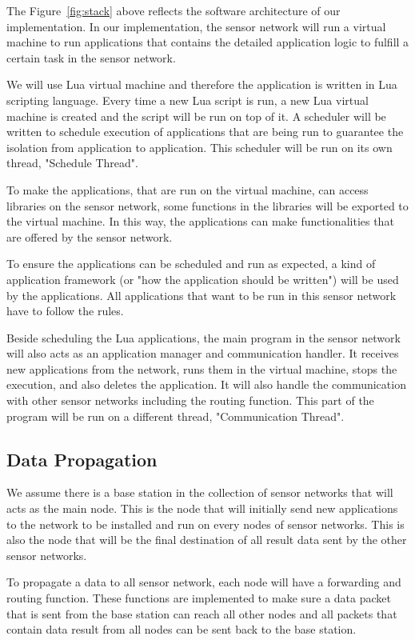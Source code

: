 \documentclass[a4paper,11pt]{article}
\begin{document}
The Figure~\ref{fig:stack} above reflects the software architecture of our
implementation. In our implementation, the sensor network will run a virtual
machine to run applications that contains the detailed application logic to
fulfill a certain task in the sensor network.

We will use Lua virtual machine and therefore the application is written in Lua
scripting language. Every time a new Lua script is run, a new Lua virtual
machine is created and the script will be run on top of it. A scheduler will be
written to schedule execution of applications that are being run to guarantee
the isolation from application to application. This scheduler will be run on
its own thread, "Schedule Thread".

To make the applications, that are run on the virtual machine, can access
libraries on the sensor network, some functions in the libraries will be
exported to the virtual machine. In this way, the applications can make
functionalities that are offered by the sensor network.

To ensure the applications can be scheduled and run as expected, a kind of
application framework (or "how the application should be written") will be used
by the applications. All applications that want to be run in this sensor
network have to follow the rules.

Beside scheduling the Lua applications, the main program in the sensor network
will also acts as an application manager and communication handler. It receives
new applications from the network, runs them in the virtual machine, stops the
execution, and also deletes the application. It will also handle the
communication with other sensor networks including the routing function. This
part of the program will be run on a different thread, "Communication Thread".

\subsection{Data Propagation}

We assume there is a base station in the collection of sensor networks that
will acts as the main node. This is the node that will initially send new
applications to the network to be installed and run on every nodes of sensor
networks. This is also the node that will be the final destination of all
result data sent by the other sensor networks.

To propagate a data to all sensor network, each node will have a forwarding and
routing function. These functions are implemented to make sure a data packet
that is sent from the base station can reach all other nodes and all packets
that contain data result from all nodes can be sent back to the base station.
\end{document}
